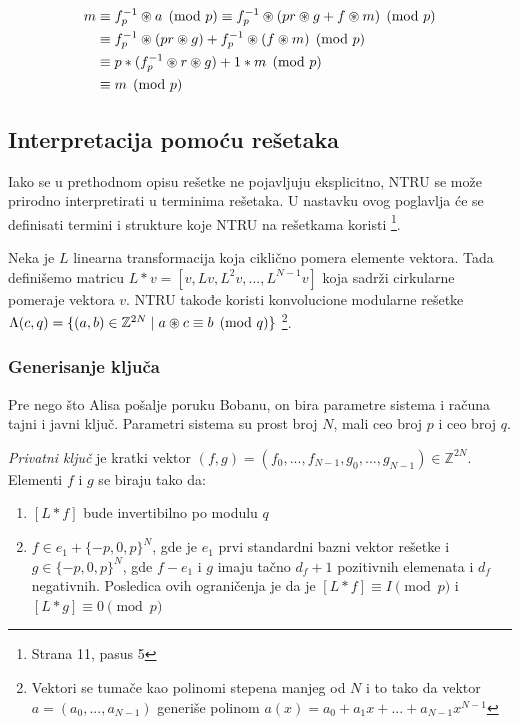 \begin{align*}
    m &\equiv f_p^{-1} \circledast a \pmod p \equiv f_p^{-1} \circledast (pr \circledast g + f \circledast m) \pmod p \\
    &\equiv f_p^{-1} \circledast (pr \circledast g) + f_p^{-1} \circledast (f \circledast m) \pmod p \\
    &\equiv p \ast (f_p^{-1} \circledast r \circledast g) + 1\ast m \pmod p \\
    &\equiv m \pmod p
\end{align*}


\subsection{Interpretacija pomoću rešetaka}

Iako se u prethodnom opisu rešetke ne pojavljuju eksplicitno, NTRU se može prirodno interpretirati u terminima rešetaka. U nastavku ovog poglavlja će se definisati termini i strukture koje NTRU na rešetkama koristi \cite{meyer2025postquantumcryptographyanalysiscodebased}\footnote{Strana 11, pasus 5}.

Neka je $L$ linearna transformacija koja ciklično pomera elemente vektora. Tada definišemo matricu $L\ast v = [v, Lv, L^2v,..., L^{N-1}v] $ koja sadrži cirkularne pomeraje vektora $v$. NTRU takođe koristi konvolucione modularne rešetke $\Lambda(c, q) = \{(a,b) \in \mathbb{Z}^{2N} \mid a \circledast c \equiv b \pmod q\} $ \cite{meyer2025postquantumcryptographyanalysiscodebased} \footnote{Vektori se tumače kao polinomi stepena manjeg od $N$ i to tako da vektor $a = (a_0,..., a_{N-1})$ generiše polinom $a(x)= a_0 + a_1x+...+a_{N-1}x^{N-1}$}.

\subsubsection{Generisanje ključa}

Pre nego što Alisa pošalje poruku Bobanu, on bira parametre sistema i računa tajni i javni ključ. Parametri sistema su prost broj $N$, mali ceo broj $p$ i ceo broj $q$.

\textit{Privatni ključ} je kratki vektor $(f, g) = (f_0, ..., f_{N-1}, g_0,..., g_{N-1}) \in \mathbb{Z}^{2N}$. Elementi $f$ i $g$ se biraju tako da:
\begin{enumerate}
    \item $[L\ast f]$ bude invertibilno po modulu $q$
    \item $f \in e_1 + \{-p, 0, p\}^N$, gde je $e_1$ prvi standardni bazni vektor rešetke i $g \in \{-p, 0, p\}^N$, gde $f-e_1$ i $g$ imaju tačno $d_f+1$ pozitivnih elemenata i $d_f$ negativnih. Posledica ovih ograničenja je da je $[L \ast f] \equiv I \pmod p$ i $[L \ast g] \equiv 0 \pmod p$
\end{enumerate}

